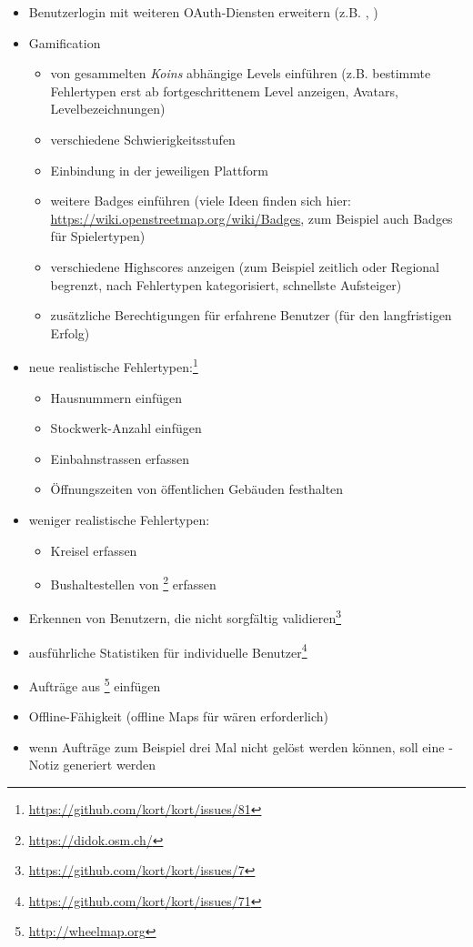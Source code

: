 \begin{itemize}
	\item Benutzerlogin mit weiteren \gls{OAuth}-Diensten erweitern (z.B. , )
	\item \gls{Gamification}
	\begin{itemize}
		\item von gesammelten \emph{Koins} abhängige Levels einführen (z.B. bestimmte Fehlertypen erst ab fortgeschrittenem Level anzeigen, Avatars, Levelbezeichnungen)
		\item verschiedene Schwierigkeitsstufen
		\item Einbindung in  der jeweiligen Plattform
		\item weitere Badges einführen (viele Ideen finden sich hier: \url{https://wiki.openstreetmap.org/wiki/Badges}, zum Beispiel auch Badges für Spielertypen)
		\item verschiedene Highscores anzeigen (zum Beispiel zeitlich oder Regional begrenzt, nach Fehlertypen kategorisiert, schnellste Aufsteiger)
		\item zusätzliche Berechtigungen für erfahrene Benutzer (für den langfristigen Erfolg)
	\end{itemize}
	\item neue realistische Fehlertypen:\footnote{\url{https://github.com/kort/kort/issues/81}}
	\begin{itemize}
		\item Hausnummern einfügen
		\item Stockwerk-Anzahl einfügen
		\item Einbahnstrassen erfassen
		\item Öffnungszeiten von öffentlichen Gebäuden festhalten
	\end{itemize}
	\item weniger realistische Fehlertypen:
		\begin{itemize}
			\item Kreisel erfassen
			\item Bushaltestellen von \footnote{\url{https://didok.osm.ch/}} erfassen
		\end{itemize}
	\item Erkennen von Benutzern, die nicht sorgfältig validieren\footnote{\url{https://github.com/kort/kort/issues/7}}
	\item ausführliche Statistiken für individuelle Benutzer\footnote{\url{https://github.com/kort/kort/issues/71}}
	\item Aufträge aus \footnote{\url{http://wheelmap.org}}	einfügen
	\item Offline-Fähigkeit (offline Maps für  wären erforderlich)
	\item wenn Aufträge zum Beispiel drei Mal nicht gelöst werden können, soll eine -Notiz generiert werden
\end{itemize}

